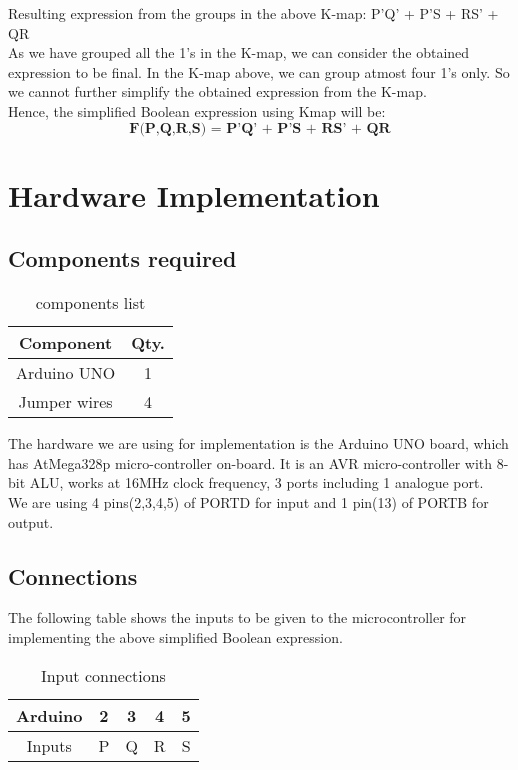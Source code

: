 \documentclass[journal,12pt,twocolumn]{IEEEtran}
\begin{document}
Resulting expression from the groups in the above K-map: P'Q' + P'S + RS' + QR\\

As we have grouped all the 1's in the K-map, we can consider the obtained expression to be final. In the K-map above, we can group atmost four 1's only. So we cannot further simplify the obtained expression from the K-map.\\

\bigskip Hence, the simplified Boolean expression using Kmap will be: 
$$\textbf{F(P,Q,R,S) = P'Q' + P'S + RS' + QR}$$
\newpage
\section{Hardware Implementation} 

\subsection{Components required}
\begin{table}[h]
\centering
\begin{tabular}{|c|c|}
\hline
\textbf{Component } & \textbf{Qty.}\\
\hline
Arduino UNO & 1\\
\hline
Jumper wires & 4 \\
\hline
\end{tabular}
\bigskip
\caption{components list}
\end{table}

The hardware we are using for implementation is the Arduino UNO board, which has AtMega328p micro-controller on-board. It is an AVR micro-controller with 8-bit ALU, works at 16MHz clock frequency, 3 ports including 1 analogue port. \\
We are using 4 pins(2,3,4,5) of PORTD for input and 1 pin(13) of PORTB for output.

\subsection{Connections}
The following table shows the inputs to be given to the microcontroller for implementing the above simplified Boolean expression.\\

\bigskip
\begin{table}[h]
\centering
\begin{tabular}{|c|c|c|c|c|}
\hline
Arduino & 2 & 3 & 4 & 5 \\
\hline
Inputs & P & Q & R & S \\
\hline
\end{tabular}
\bigskip
\caption{Input connections}
\end{table}
\end{document}
